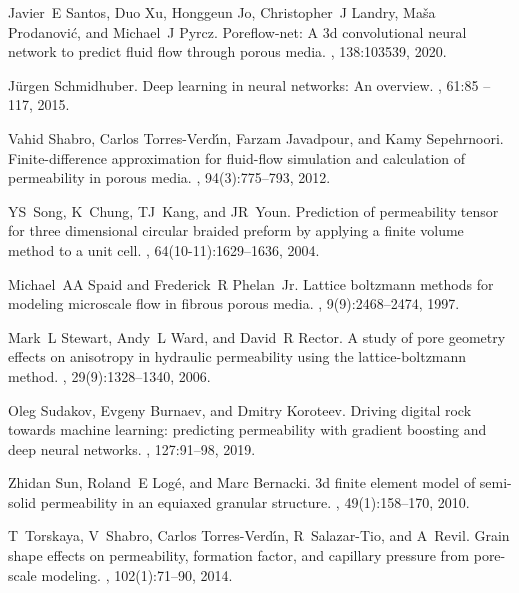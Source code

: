 \documentclass{article}
\begin{document}
\begin{thebibliography}{10}
Javier~E Santos, Duo Xu, Honggeun Jo, Christopher~J Landry, Ma{\v{s}}a
  Prodanovi{\'c}, and Michael~J Pyrcz.
\newblock Poreflow-net: A 3d convolutional neural network to predict fluid flow
  through porous media.
, 138:103539, 2020.

Jürgen Schmidhuber.
\newblock Deep learning in neural networks: An overview.
, 61:85 -- 117, 2015.

Vahid Shabro, Carlos Torres-Verd{\'\i}n, Farzam Javadpour, and Kamy
  Sepehrnoori.
\newblock Finite-difference approximation for fluid-flow simulation and
  calculation of permeability in porous media.
, 94(3):775--793, 2012.

YS~Song, K~Chung, TJ~Kang, and JR~Youn.
\newblock Prediction of permeability tensor for three dimensional circular
  braided preform by applying a finite volume method to a unit cell.
, 64(10-11):1629--1636, 2004.

Michael~AA Spaid and Frederick~R Phelan~Jr.
\newblock Lattice boltzmann methods for modeling microscale flow in fibrous
  porous media.
, 9(9):2468--2474, 1997.

Mark~L Stewart, Andy~L Ward, and David~R Rector.
\newblock A study of pore geometry effects on anisotropy in hydraulic
  permeability using the lattice-boltzmann method.
, 29(9):1328--1340, 2006.

Oleg Sudakov, Evgeny Burnaev, and Dmitry Koroteev.
\newblock Driving digital rock towards machine learning: predicting
  permeability with gradient boosting and deep neural networks.
, 127:91--98, 2019.

Zhidan Sun, Roland~E Log{\'e}, and Marc Bernacki.
\newblock 3d finite element model of semi-solid permeability in an equiaxed
  granular structure.
, 49(1):158--170, 2010.

T~Torskaya, V~Shabro, Carlos Torres-Verd{\'\i}n, R~Salazar-Tio, and A~Revil.
\newblock Grain shape effects on permeability, formation factor, and capillary
  pressure from pore-scale modeling.
, 102(1):71--90, 2014.


\end{thebibliography}
\end{document}
